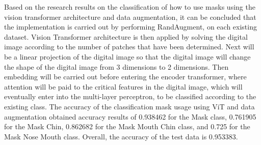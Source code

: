\documentclass{article}
\begin{document}
Based on the research results on the classification of how to use masks using the vision transformer architecture and data augmentation, it can be concluded that the implementation is carried out by performing RandAugment, on each existing dataset. Vision Transformer architecture is then applied by solving the digital image according to the number of patches that have been determined. Next will be a linear projection of the digital image so that the digital image will change the shape of the digital image from 3 dimensions to 2 dimensions. Then embedding will be carried out before entering the encoder transformer, where attention will be paid to the critical features in the digital image, which will eventually enter into the multi-layer perceptron, to be classified according to the existing class. The accuracy of the classification mask usage using ViT and data augmentation obtained accuracy results of 0.938462 for the Mask class, 0.761905 for the Mask Chin, 0.862682 for the Mask Mouth Chin class, and 0.725 for the Mask Nose Mouth class. Overall, the accuracy of the test data is 0.953383.



\end{document}
